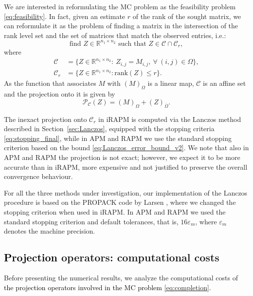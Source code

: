 \documentclass[pdflatex,sn-mathphys-num]{sn-jnl}
\numberwithin{equation}{section}%
\def\R{\mathbb{R}}
\newcommand{\rank}[1]{\textrm{rank}(#1)}
\newcommand{\setRank}{{\mathcal{C}_r}}
\newcommand{\setNorm}{{\mathcal{C} }}
\newcommand{\projNorm}{{\mathcal{P}_{\mathcal{C} }}}
\newcommand{\REV}[1]{\textcolor{black}{#1}}
\theoremstyle{thmstyleone}%
\theoremstyle{thmstyletwo}%
\theoremstyle{thmstylethree}%
\begin{document}
We are interested in reformulating the MC problem as the feasibility problem \eqref{eq:feasibility}. In fact, given an estimate $r$ of the rank of the sought matrix, we can reformulate it as the problem of finding a matrix in the intersection of the {rank level set} and the set of matrices that match the observed entries, i.e.:
\begin{equation}\label{eq:completion}
	\text{find }Z\in\R^{n_1\times n_2}\text{ such that }Z\in \setNorm\cap \setRank, 
\end{equation}
where
\begin{align}\label{eq:constraints_MC}
	\setNorm &= \{Z\in \mathbb{R}^{n_1\times n_2}: \ Z_{i,j} = M_{i,j}, \ \forall \ (i,j)\in\Omega\},\\
	\setRank &= \{Z\in\mathbb{R}^{n_1\times n_2}: \rank{Z}\leq r\}.
\end{align}
As the function that associates $M$ with $(M)_\Omega$ is a linear map, $\mathcal{C} $ is an affine set and the projection onto it is given by
\begin{equation}
	\projNorm (Z) = (M)_\Omega + (Z)_{\bar\Omega}.
\end{equation}

{The inexact projection onto $\setRank$ in iRAPM is computed  via the Lanczos method described in Section~\ref{sec:Lanczos}, equipped with the stopping criteria \eqref{eq:stopping_final}, while in APM and RAPM we use the standard stopping criterion based on the bound \eqref{eq:Lanczos_error_bound_v2}. We note that also in APM and RAPM the projection is not exact; however, we expect it to be more accurate than in iRAPM, more expensive and not justified to preserve the overall convergence behaviour.}

{For all the three methods under investigation, our implementation of the Lanczos procedure is based on the PROPACK code by Larsen \cite{larsen1998lanczos}, where we changed the stopping criterion when used in iRAPM. In APM and RAPM we used the standard stopping criterion and default tolerances, that is, $16 \varepsilon_m$, where $\varepsilon_m$ denotes the machine precision}. 

\subsection{\REV{Projection} operators: computational costs}

Before presenting the numerical results, we analyze the computational costs of \REV{the projection operators involved in the MC problem \eqref{eq:completion}.}
\end{document}
